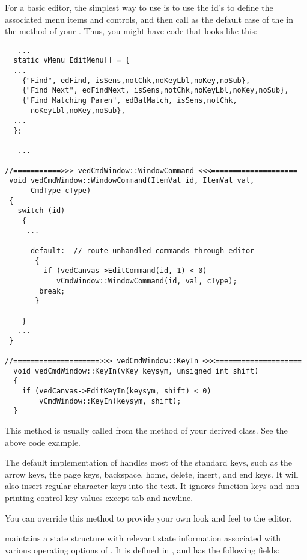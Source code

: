 For a basic editor, the simplest way to use 
is to use the  id's to define the associated menu
items and controls, and then call  as the
default case of the  in the 
method of your . Thus, you might have
code that looks like this:

\footnotesize
\begin{verbatim}
   ...
  static vMenu EditMenu[] = {
  ...
    {"Find", edFind, isSens,notChk,noKeyLbl,noKey,noSub},
    {"Find Next", edFindNext, isSens,notChk,noKeyLbl,noKey,noSub},
    {"Find Matching Paren", edBalMatch, isSens,notChk,
      noKeyLbl,noKey,noSub},
  ...
  };

   ...

//===========>>> vedCmdWindow::WindowCommand <<<====================
 void vedCmdWindow::WindowCommand(ItemVal id, ItemVal val,
      CmdType cType)
 {
   switch (id)
    {
     ...

      default:  // route unhandled commands through editor
       {
         if (vedCanvas->EditCommand(id, 1) < 0)
            vCmdWindow::WindowCommand(id, val, cType);
        break;
       }

    }
   ...
 }

//====================>>> vedCmdWindow::KeyIn <<<====================
  void vedCmdWindow::KeyIn(vKey keysym, unsigned int shift)
  {
    if (vedCanvas->EditKeyIn(keysym, shift) < 0)
        vCmdWindow::KeyIn(keysym, shift);
  }
\end{verbatim}
\normalfont\normalsize


This method is usually called from the  method
of your derived  class. See the above code
example. 

The default implementation of  handles
most of the standard keys, such as
the arrow keys, the page keys, backspace, home, delete,
insert, and end keys. It will also insert regular
character keys into the text. It ignores function keys
and non-printing control key values except tab and newline.

You can override this method to provide your own look and feel
to the editor.


 maintains a state structure with relevant state
information associated with various operating options of . It is
defined in , and has the following fields:

